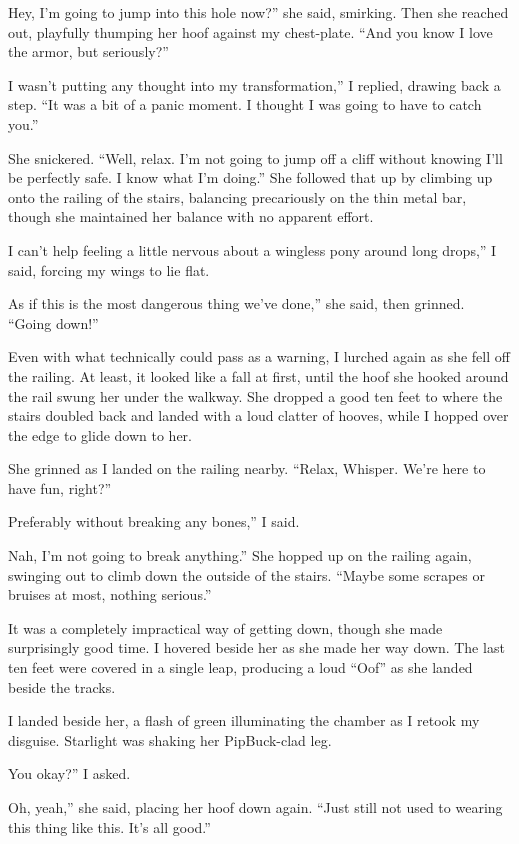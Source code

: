 \leavevmode{}Hey, I’m going to jump into this hole now?” she said, smirking. Then she reached out, playfully thumping her hoof against my chest-plate. “And you know I love the armor, but seriously?”

\leavevmode{}I wasn’t putting any thought into my transformation,” I replied, drawing back a step. “It was a bit of a panic moment. I thought I was going to have to catch you.”

She snickered. “Well, relax. I’m not going to jump off a cliff without knowing I’ll be perfectly safe. I know what I’m doing.” She followed that up by climbing up onto the railing of the stairs, balancing precariously on the thin metal bar, though she maintained her balance with no apparent effort.

\leavevmode{}I can’t help feeling a little nervous about a wingless pony around long drops,” I said, forcing my wings to lie flat.

\leavevmode{}As if this is the most dangerous thing we’ve done,” she said, then grinned. “Going down!”

Even with what technically could pass as a warning, I lurched again as she fell off the railing. At least, it looked like a fall at first, until the hoof she hooked around the rail swung her under the walkway. She dropped a good ten feet to where the stairs doubled back and landed with a loud clatter of hooves, while I hopped over the edge to glide down to her.

She grinned as I landed on the railing nearby. “Relax, Whisper. We’re here to have fun, right?”

\leavevmode{}Preferably without breaking any bones,” I said.

\leavevmode{}Nah, I’m not going to break anything.” She hopped up on the railing again, swinging out to climb down the outside of the stairs. “Maybe some scrapes or bruises at most, nothing serious.”

It was a completely impractical way of getting down, though she made surprisingly good time. I hovered beside her as she made her way down. The last ten feet were covered in a single leap, producing a loud “Oof” as she landed beside the tracks.

I landed beside her, a flash of green illuminating the chamber as I retook my disguise. Starlight was shaking her PipBuck-clad leg.

\leavevmode{}You okay?” I asked.

\leavevmode{}Oh, yeah,” she said, placing her hoof down again. “Just still not used to wearing this thing like this. It’s all good.”


